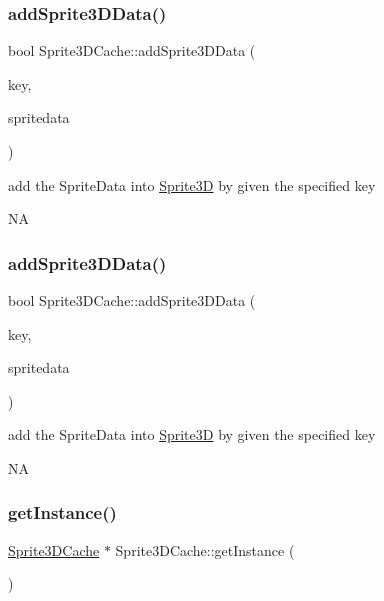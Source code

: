 \subsubsection{\texorpdfstring{add\+Sprite3\+D\+Data()}{addSprite3DData()}\hspace{0.1cm}{\footnotesize\ttfamily [1/2]}}
{\footnotesize\ttfamily bool Sprite3\+D\+Cache\+::add\+Sprite3\+D\+Data (\begin{DoxyParamCaption}\item[{const std\+::string \&}]{key,  }\item[{\hyperlink{structSprite3DCache_1_1Sprite3DData}{Sprite3\+D\+Cache\+::\+Sprite3\+D\+Data} $\ast$}]{spritedata }\end{DoxyParamCaption})}

add the Sprite\+Data into \hyperlink{classSprite3D}{Sprite3D} by given the specified key

NA \mbox{\label{classSprite3DCache_a8347de6c622a257f92a286f21a1774bf}} 
\subsubsection{\texorpdfstring{add\+Sprite3\+D\+Data()}{addSprite3DData()}\hspace{0.1cm}{\footnotesize\ttfamily [2/2]}}
{\footnotesize\ttfamily bool Sprite3\+D\+Cache\+::add\+Sprite3\+D\+Data (\begin{DoxyParamCaption}\item[{const std\+::string \&}]{key,  }\item[{\hyperlink{structSprite3DCache_1_1Sprite3DData}{Sprite3\+D\+Data} $\ast$}]{spritedata }\end{DoxyParamCaption})}

add the Sprite\+Data into \hyperlink{classSprite3D}{Sprite3D} by given the specified key

NA \mbox{\label{classSprite3DCache_abded39f123736a9dd38eda5b8e5d5424}} 
\subsubsection{\texorpdfstring{get\+Instance()}{getInstance()}\hspace{0.1cm}{\footnotesize\ttfamily [1/2]}}
{\footnotesize\ttfamily \hyperlink{classSprite3DCache}{Sprite3\+D\+Cache} $\ast$ Sprite3\+D\+Cache\+::get\+Instance (\begin{DoxyParamCaption}{ }\end{DoxyParamCaption})\hspace{0.3cm}{\ttfamily [static]}}


